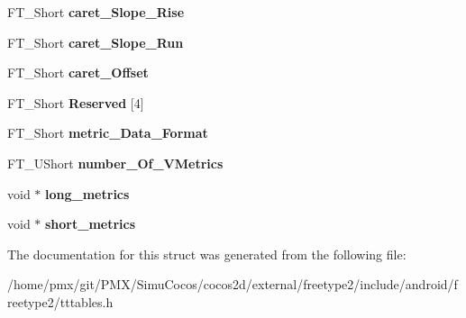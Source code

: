 \begin{DoxyCompactItemize}
\mbox{\label{structTT__VertHeader___a3218533a7d8ac5a8ebd70a970cbdbbcc}} 
F\+T\+\_\+\+Short {\bfseries caret\+\_\+\+Slope\+\_\+\+Rise}
\item 
\mbox{\label{structTT__VertHeader___a98ff91b532d827440f7140d3071d473d}} 
F\+T\+\_\+\+Short {\bfseries caret\+\_\+\+Slope\+\_\+\+Run}
\item 
\mbox{\label{structTT__VertHeader___a89ff9369f61dc5b770cde0eda954d402}} 
F\+T\+\_\+\+Short {\bfseries caret\+\_\+\+Offset}
\item 
\mbox{\label{structTT__VertHeader___a9de737abf5f617f4d18d1da2c233ef98}} 
F\+T\+\_\+\+Short {\bfseries Reserved} \mbox{[}4\mbox{]}
\item 
\mbox{\label{structTT__VertHeader___aa7c3983f62f7bf736eaaaae684b65dd7}} 
F\+T\+\_\+\+Short {\bfseries metric\+\_\+\+Data\+\_\+\+Format}
\item 
\mbox{\label{structTT__VertHeader___a4ca6fe9cdd12fbc9a1129c4fbf6bddd1}} 
F\+T\+\_\+\+U\+Short {\bfseries number\+\_\+\+Of\+\_\+\+V\+Metrics}
\item 
\mbox{\label{structTT__VertHeader___a06e0a5c26dfc56a3a92e3bd152490c83}} 
void $\ast$ {\bfseries long\+\_\+metrics}
\item 
\mbox{\label{structTT__VertHeader___ade65c828cedbc18a8072abd7ed9e7387}} 
void $\ast$ {\bfseries short\+\_\+metrics}
\end{DoxyCompactItemize}


The documentation for this struct was generated from the following file\+:\begin{DoxyCompactItemize}
\item 
/home/pmx/git/\+P\+M\+X/\+Simu\+Cocos/cocos2d/external/freetype2/include/android/freetype2/tttables.\+h\end{DoxyCompactItemize}
